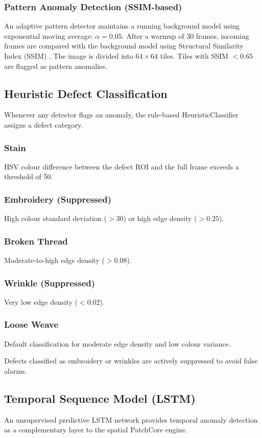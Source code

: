 \documentclass{ieeeaccess}
\begin{document}
\subsubsection{Pattern Anomaly Detection (SSIM-based)}
An adaptive pattern detector maintains a running background model using exponential moving average: $\alpha = 0.05$. After a warmup of 30 frames, incoming frames are compared with the background model using Structural Similarity Index (SSIM) \cite{b12}. The image is divided into $64 \times 64$ tiles. Tiles with SSIM $< 0.65$ are flagged as pattern anomalies.

\subsection{Heuristic Defect Classification}
Whenever any detector flags an anomaly, the rule-based HeuristicClassifier assigns a defect category.

\subsubsection{Stain}
HSV colour difference between the defect ROI and the full frame exceeds a threshold of 50.

\subsubsection{Embroidery (Suppressed)}
High colour standard deviation ($> 30$) or high edge density ($> 0.25$).

\subsubsection{Broken Thread}
Moderate-to-high edge density ($> 0.08$).

\subsubsection{Wrinkle (Suppressed)}
Very low edge density ($< 0.02$).

\subsubsection{Loose Weave}
Default classification for moderate edge density and low colour variance.

Defects classified as embroidery or wrinkles are actively suppressed to avoid false alarms.

\subsection{Temporal Sequence Model (LSTM)}
An unsupervised predictive LSTM network provides temporal anomaly detection as a complementary layer to the spatial PatchCore engine.
\end{document}
